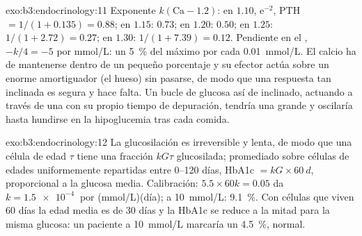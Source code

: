 \begin{solution}{exo:b3:endocrinology:11}
Exponente $k(\text{Ca} - 1.2)$: en $1.10$, $\mathrm{e}^{-2}$, PTH $= 1/
(1 + 0.135) = 0.88$; en $1.15$: $0.73$; en $1.20$: $0.50$; en $1.25$: $1/(1 +
2.72) = 0.27$; en $1.30$: $1/(1 + 7.39) = 0.12$. Pendiente en el , $-k/4 = -5$ por mmol/L: un \qty{5}{\%} del máximo por cada
\qty{0.01}{mmol/L}. El calcio ha de mantenerse dentro de un pequeño
porcentaje y su efector actúa sobre un enorme amortiguador (el hueso)
sin pasarse, de modo que una respuesta tan inclinada es segura y hace
falta. Un bucle de glucosa así de inclinado, actuando a través de una
 con su propio tiempo de depuración, tendría una  grande y oscilaría hasta hundirse en la hipoglucemia tras cada
comida.
\end{solution}

\begin{solution}{exo:b3:endocrinology:12}
La glucosilación es irreversible y lenta, de modo que una célula de
edad $\tau$ tiene una fracción $kG\tau$ glucosilada; promediado sobre
células de edades uniformemente repartidas entre \numrange{0}{120}
días, HbA1c $= kG\times\qty{60}{d}$, proporcional a la glucosa
media. Calibración: $5.5\times 60k = 0.05$ da $k =
\qty{1.5e-4}{}$ por (mmol/L)(día); a \qty{10}{mmol/L}: \qty{9.1}{\%}.
Con células que viven 60 días la edad media es de 30 días y la HbA1c se
reduce a la mitad para la misma glucosa: un paciente a \qty{10}{mmol/L}
marcaría un \qty{4.5}{\%}, normal.
\end{solution}

